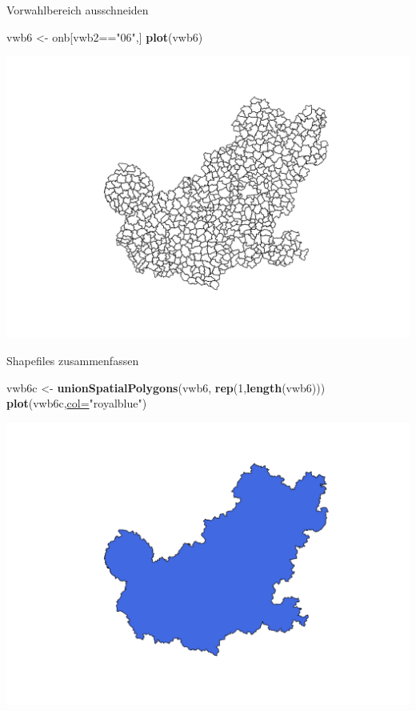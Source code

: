 \documentclass[ignorenonframetext,]{beamer}
\newenvironment{Shaded}{\begin{snugshade}}{\end{snugshade}}
\newcommand{\KeywordTok}[1]{\textcolor[rgb]{0.26,0.66,0.93}{\textbf{#1}}}
\newcommand{\DataTypeTok}[1]{\textcolor[rgb]{0.74,0.68,0.62}{\underline{#1}}}
\newcommand{\DecValTok}[1]{\textcolor[rgb]{0.27,0.67,0.26}{#1}}
\newcommand{\StringTok}[1]{\textcolor[rgb]{0.02,0.61,0.04}{#1}}
\newcommand{\OperatorTok}[1]{\textcolor[rgb]{0.74,0.68,0.62}{#1}}
\newcommand{\NormalTok}[1]{\textcolor[rgb]{0.74,0.68,0.62}{#1}}
\begin{document}
\begin{frame}[fragile]{Vorwahlbereich ausschneiden}

\begin{Shaded}
\begin{Highlighting}[]
\NormalTok{vwb6 <-}\StringTok{ }\NormalTok{onb[vwb2}\OperatorTok{==}\StringTok{"06"}\NormalTok{,]}
\KeywordTok{plot}\NormalTok{(vwb6)}
\end{Highlighting}
\end{Shaded}

\includegraphics{Geomedizin_files/figure-beamer/unnamed-chunk-87-1.pdf}

\end{frame}

\begin{frame}[fragile]{Shapefiles zusammenfassen}

\begin{Shaded}
\begin{Highlighting}[]
\NormalTok{vwb6c <-}\StringTok{ }\KeywordTok{unionSpatialPolygons}\NormalTok{(vwb6,}
              \KeywordTok{rep}\NormalTok{(}\DecValTok{1}\NormalTok{,}\KeywordTok{length}\NormalTok{(vwb6)))}
\KeywordTok{plot}\NormalTok{(vwb6c,}\DataTypeTok{col=}\StringTok{"royalblue"}\NormalTok{)}
\end{Highlighting}
\end{Shaded}

\includegraphics{Geomedizin_files/figure-beamer/unnamed-chunk-88-1.pdf}

\end{frame}
\end{document}
